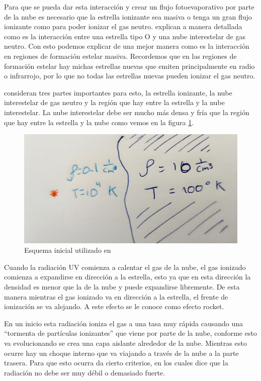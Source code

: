 \documentclass{book}
\begin{document}
Para que se pueda dar esta interacción y crear un flujo fotoevaporativo por parte de la nube es necesario que la estrella ionizante sea masiva o tenga un gran flujo ionizante como para poder ionizar el gas neutro. \cite{OortySpitzer_1955} explican a manera detallada como es la interacción entre una estrella tipo O y una nube interestelar de gas neutro. Con esto podemos explicar de una mejor manera como es la interacción en regiones de formación estelar masiva. Recordemos que en las regiones de formación estelar hay michas estrellas nuevas que emiten principalmente en radio o infrarrojo, por lo que no todas las estrellas nuevas pueden ionizar el gas neutro.

\cite{OortySpitzer_1955} consideran tres partes importantes para esto, la estrella ionizante, la nube interestelar de gas neutro y la región que hay entre la estrella y la nube interestelar. La nube interestelar debe ser mucho más densa y fría que la región que hay entre la estrella y la nube como vemos en la figura \ref{kahn_zones}.

\begin{figure}[h]
    \centering
    \includegraphics[width=0.5 \textwidth]{images Chapter 1/C1_Kahn.jpg}
    \caption{Esquema inicial utilizado en \cite{Kahn:1954}}
    \label{kahn_zones}
\end{figure}

Cuando la radiación UV comienza a calentar el gas de la nube, el gas ionizado comienza a expandirse en dirección a la estrella, esto ya que en esta dirección la densidad es menor que la de la nube y puede expandirse libremente. De esta manera mientras el gas ionizado va en dirección a la estrella, el frente de ionización se va alejando. A este efecto se le conoce como efecto rocket.

En un inicio esta radiación ioniza el gas a una tasa muy rápida causando una ``tormenta de partículas ionizantes'' que viene por parte de la nube, conforme esto va evolucionando se crea una capa aislante alrededor de la nube. Mientras esto ocurre hay un choque interno que va viajando a través de la nube a la parte trasera. Para que esto ocurra \cite{Kahn:1954} da cierto criterios, en los cuales dice que la radiación no debe ser muy débil o demasiado fuerte.
\end{document}
